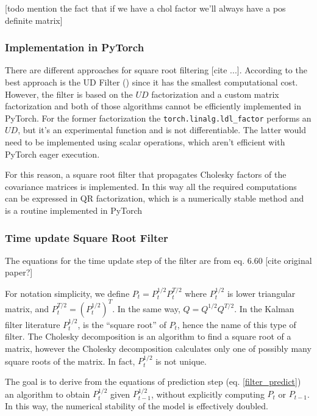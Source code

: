 \documentclass{article}
\let\Oldsubsubsection\subsubsection
\renewcommand{\subsubsection}{\FloatBarrier\Oldsubsubsection}
\begin{document}
[todo mention the fact that if we have a chol factor we'll always have a pos definite matrix]

\subsubsection{Implementation in PyTorch}

There are different approaches for square root filtering [cite ...]. According to \cite{mohinder_s_grewal_kalman_2001} the best approach is the UD Filter (\cite{bierman_numerical_1977}) since it has the smallest computational cost. However, the filter is based on the $UD$ factorization and a custom matrix factorization \cite{mohinder_s_grewal_kalman_2001} and both of those algorithms cannot be efficiently implemented in PyTorch. For the former factorization the \verb|torch.linalg.ldl_factor| performs an $UD$, but it's an experimental function and is not differentiable. The latter would need to be implemented using scalar operations, which aren't efficient with PyTorch eager execution.

For this reason, a square root filter that propagates Cholesky factors of the covariance matrices is implemented. In this way all the required computations can be expressed in QR factorization, which is a numerically stable method and is a routine implemented in PyTorch

\subsubsection{Time update Square Root Filter}

The equations for the time update step of the filter are from \cite{mohinder_s_grewal_kalman_2001} eq. 6.60 [cite original paper?]

For notation simplicity, we define $P_t=P_t^{1/2}P_t^{T/2}$ where $P_t^{1/2}$ is lower triangular matrix, and $P_t^{T/2} = (P_t^{1/2})^T$. In the same way, $Q=Q^{1/2}Q^{T/2}$. In the Kalman filter literature $P_t^{1/2}$, is the ``square root'' of $P_t$, hence the name of this type of filter. The Cholesky decomposition is an algorithm to find a square root of a matrix, however the Cholesky decomposition calculates only one of possibly many square roots of the matrix. In fact, $P_t^{1/2}$ is not unique.

The goal is to derive from the equations of prediction step (eq. \ref{filter_predict}) an algorithm to obtain $P_t^{1/2}$ given $P_{t-1}^{1/2}$, without explicitly computing $P_t$ or $P_{t-1}$. In this way, the numerical stability of the model is effectively doubled.
\end{document}
